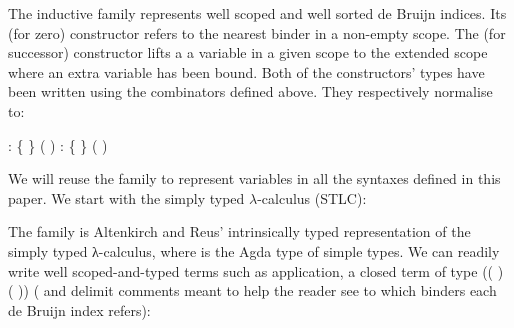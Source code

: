\begin{minipage}{\textwidth}
\end{minipage}

The inductive family  represents well scoped and well sorted
de Bruijn indices. Its  (for zero) constructor refers to the
nearest binder in a non-empty scope. The  (for successor)
constructor lifts a a variable in a given scope to the extended scope
where an extra variable has been bound. Both of the constructors'
types have been written using the combinators defined above.  They
respectively normalise to:
\begin{center}
   : { \{ \}
               ( \AIC{::} )}
  \qquad
   : { \{  \}
               
               ( \AIC{::} )}
\end{center}
We will reuse the  family to represent variables in all the
syntaxes defined in this paper. We start with the simply typed
$\lambda$-calculus (STLC):
\begin{center}
  \begin{minipage}[t]{0.4\textwidth}
  \end{minipage}
  \begin{minipage}[t]{0.5\textwidth}
  \end{minipage}
\end{center}

The   family  is Altenkirch and Reus'
intrinsically typed representation of the simply typed λ-calculus,
where  is the Agda type of simple types.  We can readily
write well scoped-and-typed terms such as application, a closed
term of type {((  )  ( 
  ))} (\AC{\{-} and \AC{-\}} delimit comments meant to help the
reader see to which binders each de Bruijn index refers):

\begin{center}
\end{center}


